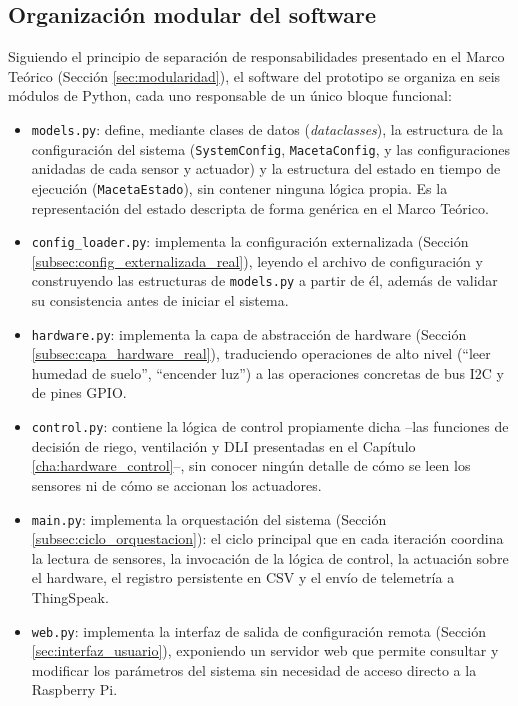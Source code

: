 \subsection{Organización modular del software}
\label{subsec:organizacion_modular_real}

Siguiendo el principio de separación de responsabilidades presentado en el Marco Teórico (Sección \ref{sec:modularidad}), el software del prototipo se organiza en seis módulos de Python, cada uno responsable de un único bloque funcional:

\begin{itemize}
    \item \texttt{models.py}: define, mediante clases de datos (\textit{dataclasses}), la estructura de la configuración del sistema (\texttt{SystemConfig}, \texttt{MacetaConfig}, y las configuraciones anidadas de cada sensor y actuador) y la estructura del estado en tiempo de ejecución (\texttt{MacetaEstado}), sin contener ninguna lógica propia. Es la representación del estado descripta de forma genérica en el Marco Teórico.
    \item \texttt{config\_loader.py}: implementa la configuración externalizada (Sección \ref{subsec:config_externalizada_real}), leyendo el archivo de configuración y construyendo las estructuras de \texttt{models.py} a partir de él, además de validar su consistencia antes de iniciar el sistema.
    \item \texttt{hardware.py}: implementa la capa de abstracción de hardware (Sección \ref{subsec:capa_hardware_real}), traduciendo operaciones de alto nivel (``leer humedad de suelo'', ``encender luz'') a las operaciones concretas de bus I2C y de pines GPIO.
    \item \texttt{control.py}: contiene la lógica de control propiamente dicha --las funciones de decisión de riego, ventilación y DLI presentadas en el Capítulo \ref{cha:hardware_control}--, sin conocer ningún detalle de cómo se leen los sensores ni de cómo se accionan los actuadores.
    \item \texttt{main.py}: implementa la orquestación del sistema (Sección \ref{subsec:ciclo_orquestacion}): el ciclo principal que en cada iteración coordina la lectura de sensores, la invocación de la lógica de control, la actuación sobre el hardware, el registro persistente en CSV y el envío de telemetría a ThingSpeak.
    \item \texttt{web.py}: implementa la interfaz de salida de configuración remota (Sección \ref{sec:interfaz_usuario}), exponiendo un servidor web que permite consultar y modificar los parámetros del sistema sin necesidad de acceso directo a la Raspberry Pi.
\end{itemize}

